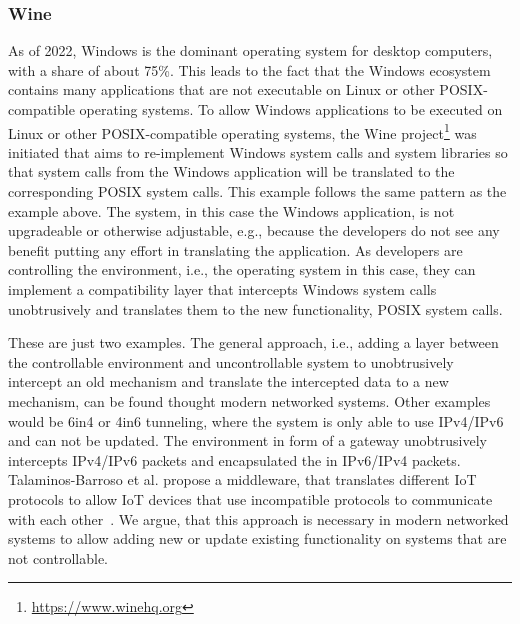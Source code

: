 \subsubsection{Wine}
As of 2022, Windows is the dominant operating system for desktop computers, with a share of about 75\%.
This leads to the fact that the Windows ecosystem contains many applications that are not executable on Linux or other POSIX-compatible operating systems.
To allow Windows applications to be executed on Linux or other POSIX-compatible operating systems, the Wine project\footnote{\url{https://www.winehq.org}} was initiated that aims to re-implement Windows system calls and system libraries so that system calls from the Windows application will be translated to the corresponding POSIX system calls.
This example follows the same pattern as the example above.
The system, in this case the Windows application, is not upgradeable or otherwise adjustable, e.g., because the developers do not see any benefit putting any effort in translating the application.
As developers are controlling the environment, i.e., the operating system in this case, they can implement a compatibility layer that intercepts Windows system calls unobtrusively and translates them to the new functionality, POSIX system calls.

These are just two examples.
The general approach, i.e., adding a layer between the controllable environment and uncontrollable system to unobtrusively intercept an old mechanism and translate the intercepted data to a new mechanism, can be found thought modern networked systems.
Other examples would be 6in4 or 4in6 tunneling, where the system is only able to use IPv4/IPv6 and can not be updated.
The environment in form of a gateway unobtrusively intercepts IPv4/IPv6 packets and encapsulated the in IPv6/IPv4 packets.
Talaminos-Barroso et al. propose a middleware, that translates different IoT protocols to allow IoT devices that use incompatible protocols to communicate with each other~\cite{talaminos2022interceptor}.
We argue, that this approach is necessary in modern networked systems to allow adding new or update existing functionality on systems that are not controllable.

